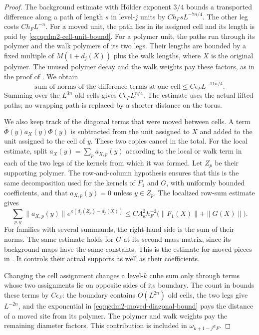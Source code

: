 \documentclass[11pt,letterpaper,reqno]{amsart}
\theoremstyle{definition}
\theoremstyle{remark}
\begin{document}
\begin{proof}
The background estimate with H\"older exponent $3/4$
bounds a transported difference along a path of length
$s$ in level-$j$ units by $Ch_FsL^{-7n/4}$.
The other leg costs $Ch_FL^{-n}$.  For a moved unit,
the path lies in its assigned cell and its length is
paid by \eqref{eq:qcdm2-cell-unit-bound}.  For a polymer
unit, the paths run through its polymer and the walk
polymers of its two legs.  Their lengths are bounded by
a fixed multiple of $M(1+d_j(X))$ plus the walk lengths,
where $X$ is the original polymer. The unused polymer
decay and the walk weights
pay these factors, as in the proof of
\cite[Lem. 7.9]{QCDM1}.  We obtain
\[
 \text{sum of norms of the difference terms at one cell}
       \le C\epsilon_FL^{-11n/4}.
\]
Summing over the $L^{3n}$ old cells gives
$C\epsilon_FL^{n/4}$.  The estimate uses the actual
lifted paths; no wrapping path is replaced by a shorter
distance on the torus.

We also keep track of the diagonal terms that were moved
between cells.  A term
$\bar\Phi(y)a_X(y)\Phi(y)$ is subtracted from the unit
assigned to $X$ and added to the unit assigned to the
cell of $y$.  These two copies cancel in the total.
For the local estimate, split $a_X(y)=\sum_pa_{X,p}(y)$
according to the local or walk term in each of the two
legs of the kernels from which it was formed.  Let
$Z_p$ be their supporting polymer.  The row-and-column
hypothesis ensures that this is the same decomposition
used for the kernels of $F_1$ and $G$, with uniformly
bounded coefficients, and that $a_{X,p}(y)=0$ unless
$y\in Z_p$.  The localized row-sum estimate gives
\[
 \sum_{p,y}\|a_{X,p}(y)\|
             e^{\kappa(d_j(Z_p)-d_j(X))}
 \le CA_\kappa^2h_F^{-2}
          \bigl(\|F_1(X)\|+\|G(X)\|\bigr).
\]
For families with several summands, the right-hand side
is the sum of their norms.  The same estimate holds
for $G$ at its second mass matrix, since its background
maps have the same constants.  This is the estimate for
moved pieces in \cite[Prop. 10.1]{QCDM1}.
It controls their actual supports as well as their
coefficients.

Changing the cell assignment changes a level-$k$ cube
sum only through terms whose two assignments lie on
opposite sides of its boundary.  The count in
\cite[Lem. 7.9]{QCDM1} bounds these terms by
$C\epsilon_F$: the boundary contains $O(L^{2n})$
old cells, the two legs give $L^{-2n}$, and the
exponential in \eqref{eq:qcdm2-moved-diagonal-bound}
pays the distance of a moved site from its polymer.
The polymer and walk weights pay the remaining
diameter factors.  This contribution is included in
$\omega_{k+1-j}\epsilon_F$.


\end{proof}
\end{document}
